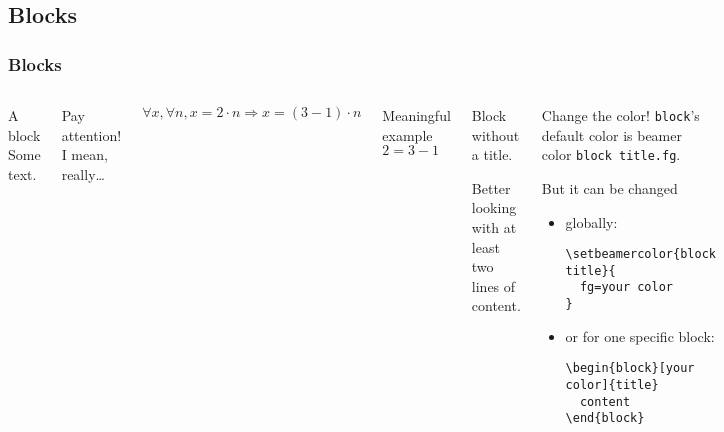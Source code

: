 \documentclass[aspectratio=169]{beamer}
\begin{document}
\subsection{Blocks}
\begin{frame}[fragile]
  \frametitle{Blocks}
  \begin{columns}
    \begin{block}{A block}
      Some text.
    \end{block}

    \begin{alertblock}{Pay attention!}
      I mean, really\dots
    \end{alertblock}

    \begin{theorem}
      $\forall x, \forall n, x = 2 \cdot n \Rightarrow x = (3 - 1) \cdot n$
    \end{theorem}

    \begin{exampleblock}{Meaningful example}
      $2 = 3 - 1$
    \end{exampleblock}

    \begin{block}{}
      Block without a title.

      Better looking with at least two lines of content.
    \end{block}

    \begin{block}[pink]{Change the color!}
      \texttt{block}'s default color is beamer color \texttt{block title.fg}.

      But it can be changed
      \begin{itemize}
      \item globally:
\begin{verbatim}
\setbeamercolor{block title}{
  fg=your color
}
\end{verbatim}
      \item or for one specific block:
\begin{verbatim}
\begin{block}[your color]{title}
  content
\end{block}
\end{verbatim}
      \end{itemize}
    \end{block}

  \end{columns}
\end{frame}
\end{document}
